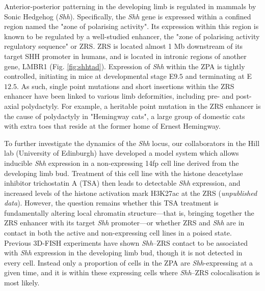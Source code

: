 \documentclass[a4paper,11pt,oneside]{book}
\begin{document}

Anterior-posterior patterning in the developing limb is regulated in mammals by Sonic Hedgehog (\emph{Shh}).\cite{Anderson2012} Specifically, the \emph{Shh} gene is expressed within a confined region named the "zone of polarising activity". Its expression within this region is known to be regulated by a well-studied enhancer, the "zone of polarising activity regulatory sequence" or ZRS.\cite{Hill2013a} ZRS is located almost 1 Mb downstream of its target SHH promoter in humans, and is located in intronic regions of another gene, LMBR1 (Fig. \ref{fig:shhtad}).\cite{Hill2013a, Laurell2012} Expression of \emph{Shh} within the ZPA is tightly controlled, initiating in mice at developmental stage E$9.5$ and terminating at E$12.5$.\cite{Amano2009} As such, single point mutations and short insertions within the ZRS enhancer have been linked to various limb deformities, including pre- and post-axial polydactyly.\cite{Anderson2012, Lettice2008, Laurell2012} For example, a heritable point mutation in the ZRS enhancer is the cause of polydactyly in "Hemingway cats", a large group of domestic cats with extra toes that reside at the former home of Ernest Hemingway.\cite{Lettice2008, Zeller2009}  

To further investigate the dynamics of the \emph{Shh} locus, our collaborators in the Hill lab (University of Edinburgh) have developed a model system which allows inducible \emph{Shh} expression in a non-expressing 14fp cell line derived from the developing limb bud. Treatment of this cell line with the histone deacetylase inhibitor trichostatin A (TSA) then leads to detectable \emph{Shh} expression, and increased levels of the histone activation mark H3K27ac at the ZRS (\emph{unpublished data}). However, the question remains whether this TSA treatment is fundamentally altering local chromatin structure---that is, bringing together the ZRS enhancer with its target \emph{Shh} promoter---or whether ZRS and \emph{Shh} are in contact in both the active and non-expressing cell lines in a poised state. Previous 3D-FISH experiments have shown \emph{Shh}--ZRS contact  to be associated with \emph{Shh} expression in the developing limb bud, though it is not detected in every cell.\cite{Amano2009, Hill2013a} Instead only a proportion of cells in the ZPA are \emph{Shh}-expressing at a given time, and it is within these expressing cells where \emph{Shh}--ZRS colocalisation is most likely.\cite{Amano2009}
\end{document}
